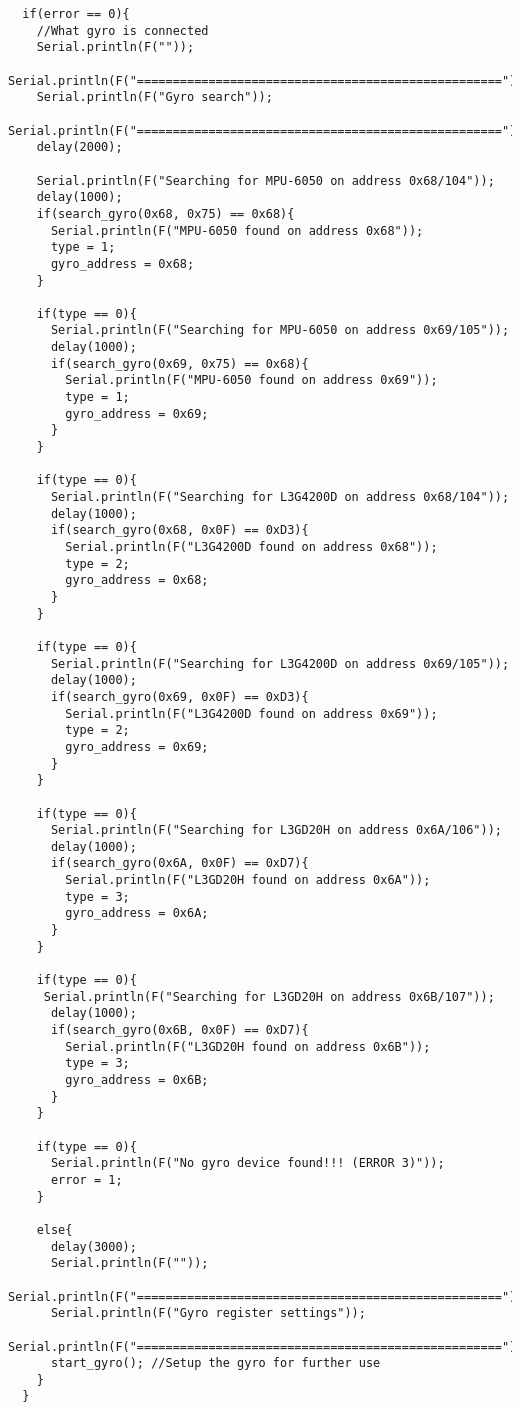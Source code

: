\begin{lstlisting}
  if(error == 0){
    //What gyro is connected
    Serial.println(F(""));
    Serial.println(F("==================================================="));
    Serial.println(F("Gyro search"));
    Serial.println(F("==================================================="));
    delay(2000);
    
    Serial.println(F("Searching for MPU-6050 on address 0x68/104"));
    delay(1000);
    if(search_gyro(0x68, 0x75) == 0x68){
      Serial.println(F("MPU-6050 found on address 0x68"));
      type = 1;
      gyro_address = 0x68;
    }
    
    if(type == 0){
      Serial.println(F("Searching for MPU-6050 on address 0x69/105"));
      delay(1000);
      if(search_gyro(0x69, 0x75) == 0x68){
        Serial.println(F("MPU-6050 found on address 0x69"));
        type = 1;
        gyro_address = 0x69;
      }
    }
    
    if(type == 0){
      Serial.println(F("Searching for L3G4200D on address 0x68/104"));
      delay(1000);
      if(search_gyro(0x68, 0x0F) == 0xD3){
        Serial.println(F("L3G4200D found on address 0x68"));
        type = 2;
        gyro_address = 0x68;
      }
    }
    
    if(type == 0){
      Serial.println(F("Searching for L3G4200D on address 0x69/105"));
      delay(1000);
      if(search_gyro(0x69, 0x0F) == 0xD3){
        Serial.println(F("L3G4200D found on address 0x69"));
        type = 2;
        gyro_address = 0x69;
      }
    }
    
    if(type == 0){
      Serial.println(F("Searching for L3GD20H on address 0x6A/106"));
      delay(1000);
      if(search_gyro(0x6A, 0x0F) == 0xD7){
        Serial.println(F("L3GD20H found on address 0x6A"));
        type = 3;
        gyro_address = 0x6A;
      }
    }
    
    if(type == 0){
     Serial.println(F("Searching for L3GD20H on address 0x6B/107"));
      delay(1000);
      if(search_gyro(0x6B, 0x0F) == 0xD7){
        Serial.println(F("L3GD20H found on address 0x6B"));
        type = 3;
        gyro_address = 0x6B;
      }
    }
    
    if(type == 0){
      Serial.println(F("No gyro device found!!! (ERROR 3)"));
      error = 1;
    }
    
    else{
      delay(3000);
      Serial.println(F(""));
      Serial.println(F("==================================================="));
      Serial.println(F("Gyro register settings"));
      Serial.println(F("==================================================="));
      start_gyro(); //Setup the gyro for further use
    }
  }
  

\end{lstlisting}
